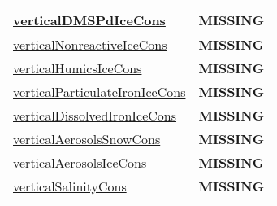 {\begin{center}
\begin{longtable}{| p{2.0in} | p{4.0in} |}
    \hline
    \hyperref[subsec:var_sec_tracer_conservation_verticalDMSPdIceCons]{verticalDMSPdIceCons} & {\bf \color{red} MISSING} \\
    \hline
    \hyperref[subsec:var_sec_tracer_conservation_verticalNonreactiveIceCons]{verticalNonreactiveIceCons} & {\bf \color{red} MISSING} \\
    \hline
    \hyperref[subsec:var_sec_tracer_conservation_verticalHumicsIceCons]{verticalHumicsIceCons} & {\bf \color{red} MISSING} \\
    \hline
    \hyperref[subsec:var_sec_tracer_conservation_verticalParticulateIronIceCons]{verticalParticulateIronIceCons} & {\bf \color{red} MISSING} \\
    \hline
    \hyperref[subsec:var_sec_tracer_conservation_verticalDissolvedIronIceCons]{verticalDissolvedIronIceCons} & {\bf \color{red} MISSING} \\
    \hline
    \hyperref[subsec:var_sec_tracer_conservation_verticalAerosolsSnowCons]{verticalAerosolsSnowCons} & {\bf \color{red} MISSING} \\
    \hline
    \hyperref[subsec:var_sec_tracer_conservation_verticalAerosolsIceCons]{verticalAerosolsIceCons} & {\bf \color{red} MISSING} \\
    \hline
    \hyperref[subsec:var_sec_tracer_conservation_verticalSalinityCons]{verticalSalinityCons} & {\bf \color{red} MISSING} \\
    \hline
\end{longtable}
\end{center}
}
